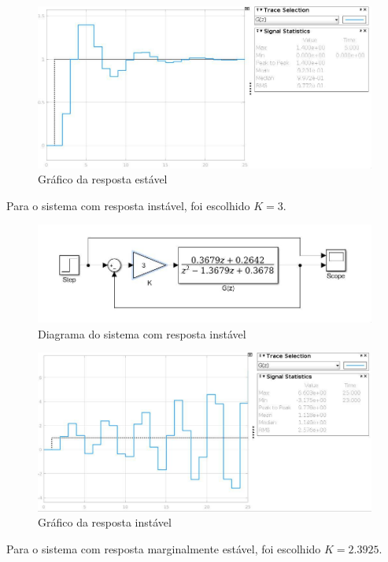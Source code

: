 \documentclass{article}
\begin{document}
\begin{figure}[H]
    \centering
        \includegraphics[width=.8\linewidth]{images/simulink_scope_stable.jpg}
        \caption{Gráfico da resposta estável}\label{fig:scope_stable}
\end{figure}

    {Para o sistema com resposta instável, foi escolhido $K = 3$.}

\begin{figure}[H]
    \centering
        \includegraphics[width=.8\linewidth]{images/Simulink_diagram_unstable.jpg}
        \caption{Diagrama do sistema com resposta instável}\label{fig:diagram_unstable}
\end{figure}

\begin{figure}[H]
    \centering
        \includegraphics[width=.8\linewidth]{images/simulink_scope_unstable.jpg}
        \caption{Gráfico da resposta instável}\label{fig:scope_unstable}
\end{figure}

    \clearpage
    {Para o sistema com resposta marginalmente estável, foi escolhido $K = 2.3925$.}
\end{document}

